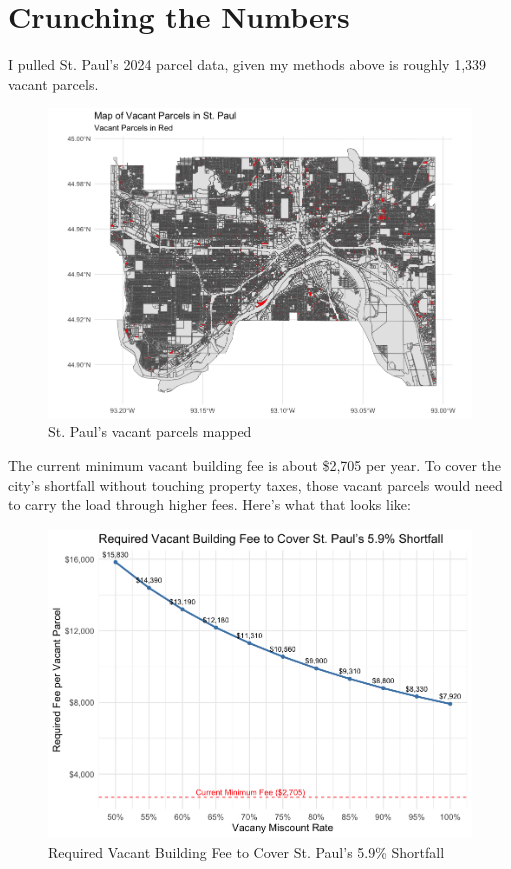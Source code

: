 \documentclass[12pt]{article}
\begin{document}
\section*{Crunching the Numbers}

I pulled St. Paul’s 2024 parcel data, given my methods above is roughly 1,339 vacant parcels. \\

\begin{figure}[H]
    \centering
    \includegraphics[width=0.9\linewidth]{Map of Vacant Parcels in St. Paul.png}
    \caption{St. Paul's vacant parcels mapped}
\end{figure}

The current minimum vacant building fee is about \$2,705 per year. To cover the city’s shortfall without touching property taxes, those vacant parcels would need to carry the load through higher fees. Here’s what that looks like:

\begin{figure}[H]
    \centering
    \includegraphics[width=0.9\linewidth]{st_paul_vacant_building_fee_graph.png}
    \caption{Required Vacant Building Fee to Cover St. Paul’s 5.9\% Shortfall}
\end{figure}
\end{document}
